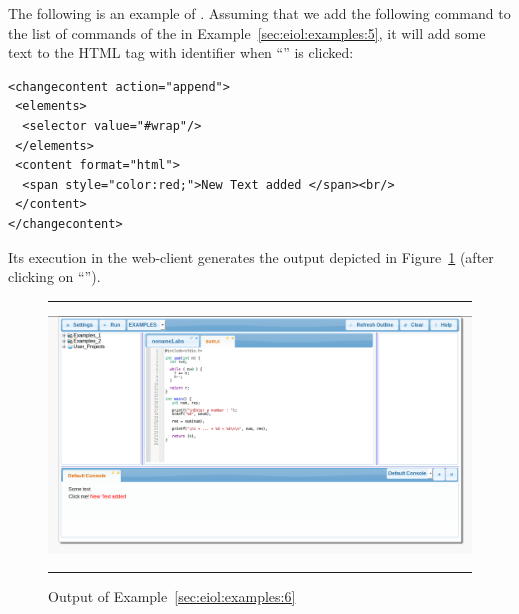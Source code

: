 \begin{example}
\label{sec:eiol:examples:6}
%
The following is an example of
. Assuming that we add the
following command to the list of commands of the
 in
Example~\ref{sec:eiol:examples:5}, it will add some text to the HTML
tag with identifier  when ``'' is clicked:

\medskip
\begin{lstlisting}
<changecontent action="append">
 <elements>
  <selector value="#wrap"/>
 </elements>
 <content format="html">
  <span style="color:red;">New Text added </span><br/>
 </content>
</changecontent> 
\end{lstlisting}

\medskip
\noindent
Its execution in the web-client generates the output depicted in
Figure~\ref{fig:examples:6} (after clicking on ``'').

\begin{figure}[h]
\hrule\smallskip
\begin{center}
\includegraphics[width=1\textwidth]{fig/example6.png}
\end{center}
\caption{Output of Example~\ref{sec:eiol:examples:6}}
\label{fig:examples:6}
\hrule
\end{figure}
\end{example}

